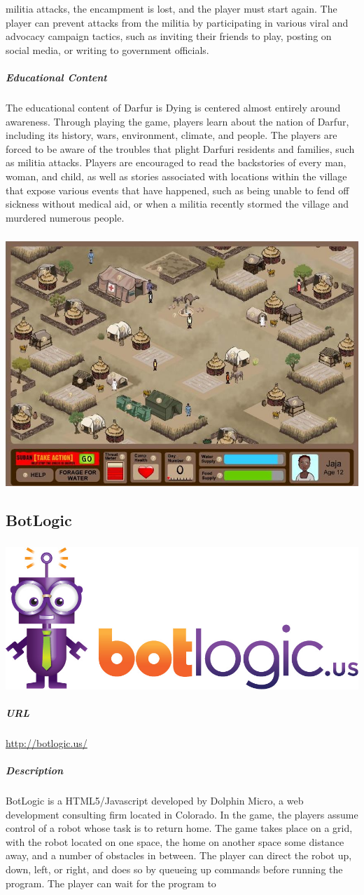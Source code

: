 militia attacks, the encampment is lost, and the player must start again. The player can prevent attacks from the militia by participating in various viral and advocacy campaign tactics, such as inviting their friends to play, posting on social media, or writing to government officials.\subparagraph{Educational Content}The educational content of Darfur is Dying is centered almost entirely around awareness. Through playing the game, players learn about the nation of Darfur, including its history, wars, environment, climate, and people. The players are forced to be aware of the troubles that plight Darfuri residents and families, such as militia attacks. Players are encouraged to read the backstories of every man, woman, and child, as well as stories associated with locations within the village that expose various events that have happened, such as being unable to fend off sickness without medical aid, or when a militia recently stormed the village and murdered numerous people.\subparagraph{}\includegraphics[width = \textwidth]{img/darfur_screen1.jpg}\subsection{BotLogic}\subparagraph{}\includegraphics[width = \textwidth]{img/botlogic_title.jpg}\subparagraph{URL}\url{http://botlogic.us/}\subparagraph{Description}BotLogic is a HTML5/Javascript developed by Dolphin Micro, a web development consulting firm located in Colorado. In the game, the players assume control of a robot whose task is to return home. The game takes place on a grid, with the robot located on one space, the home on another space some distance away, and a number of obstacles in between. The player can direct the robot up, down, left, or right, and does so by queueing up commands before running the program. The player can wait for the program to 